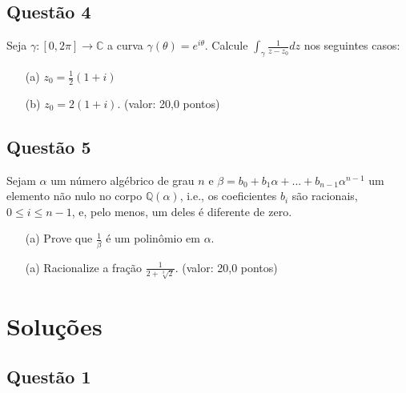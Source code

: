 \documentclass{report}
\begin{document}
\subsection{\color{blue} Quest\~ao 4}

Seja $\gamma: [0,2\pi] \to \mathbb C$ a curva $\gamma (\theta) = e^{i\theta}$. Calcule $\displaystyle \int_\gamma \frac1{z-z_0} dz$ nos seguintes casos:

\begin{enumerate}

\item[(a)] $z_0=\displaystyle \frac1{2} (1+i)$

\item[(b)] $z_0 = 2(1 + i)$. (valor: 20,0 pontos)

\end{enumerate}

\subsection{\color{blue} Quest\~ao 5}

Sejam $\alpha$ um n\'umero alg\'ebrico de grau $n$ e  $\beta = b_0 + b_1\alpha + ... + b_{n-1}\alpha^{n-1}$ um elemento n\~ao nulo no corpo $\mathbb Q(\alpha)$, i.e., os coeficientes $b_i$ s\~ao racionais, $0 \leq i \leq n-1$, e, pelo menos, um deles \'e diferente de zero.

\begin{enumerate}

\item[(a)] Prove que $\displaystyle\frac1{\beta}$ \'e um polinômio em $\alpha$.

\item[(a)] Racionalize a fra\c c\~ao $\displaystyle \frac1{2+\sqrt[3]{2}}$. (valor: 20,0 pontos)

\end{enumerate}

\section{\color{red} Solu\c c\~oes}

\subsection{\color{red} Quest\~ao 1}
\end{document}
